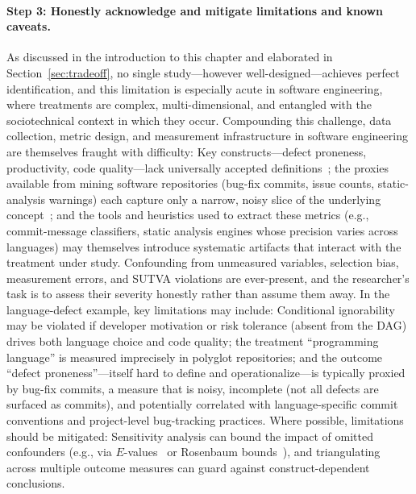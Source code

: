 \paragraph{Step 3: Honestly acknowledge and mitigate limitations and known caveats.}
As discussed in the introduction to this chapter and elaborated in Section~\ref{sec:tradeoff}, no single study---however well-designed---achieves perfect identification, and this limitation is especially acute in software engineering, where treatments are complex, multi-dimensional, and entangled with the sociotechnical context in which they occur.
Compounding this challenge, data collection, metric design, and measurement infrastructure in software engineering are themselves fraught with difficulty: Key constructs---defect proneness, productivity, code quality---lack universally accepted definitions~\cite{DBLP:journals/software/KitchenhamP96,DBLP:journals/queue/ForsgrenSMZHB21}; the proxies available from mining software repositories (bug-fix commits, issue counts, static-analysis warnings) each capture only a narrow, noisy slice of the underlying concept~\cite{DBLP:journals/ese/KalliamvakouGBS16}; and the tools and heuristics used to extract these metrics (e.g., commit-message classifiers, static analysis engines whose precision varies across languages) may themselves introduce systematic artifacts that interact with the treatment under study.
Confounding from unmeasured variables, selection bias, measurement errors, and SUTVA violations are ever-present, and the researcher's task is to assess their severity honestly rather than assume them away.
In the language-defect example, key limitations may include: Conditional ignorability may be violated if developer motivation or risk tolerance (absent from the DAG) drives both language choice and code quality; the treatment ``programming language'' is measured imprecisely in polyglot repositories; and the outcome ``defect proneness''---itself hard to define and operationalize---is typically proxied by bug-fix commits, a measure that is noisy, incomplete (not all defects are surfaced as commits), and potentially correlated with language-specific commit conventions and project-level bug-tracking practices.
Where possible, limitations should be mitigated: Sensitivity analysis can bound the impact of omitted confounders (e.g., via $E$-values~\cite{vanderweele2017sensitivity} or Rosenbaum bounds~\cite{rosenbaum2002observational}), and triangulating across multiple outcome measures can guard against construct-dependent conclusions.

